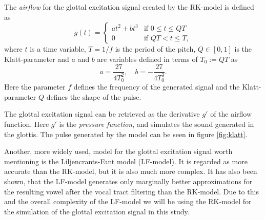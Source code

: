 \documentclass[12pt,a4]{article}
\begin{document}
The \emph{airflow} for the glottal excitation signal created by the RK-model is defined as
\begin{equation}
\label{eq:RK-model}
g(t) =
  \begin{cases}
   at^2 + bt^3  & \text{if } 0 \leq t \leq Q T \\
   0            & \text{if } Q T < t \leq T,
  \end{cases}
\end{equation}
where $t$ is a time variable, $T = 1/f$ is the period of the pitch, $Q \in \left[ 0,1 \right]$ is the Klatt-parameter and $a$ and $b$ are variables defined in terms of $T_0 := QT$ as
\begin{equation*}
a = \frac{27}{4 T_0^2}, \quad b = -\frac{27}{4 T_0^3} .
\end{equation*}
Here the parameter $f$ defines the frequency of the generated signal and the Klatt-parameter $Q$ defines the shape of the pulse.

The glottal excitation signal can be retrieved as the derivative $g'$ of the airflow function. Here $g'$ is the \emph{pressure function}, and simulates the sound generated in the glottis. The pulse generated by the model can be seen in figure \ref{fig:klatt}.

Another, more widely used, model for the glottal excitation signal worth mentioning is the Liljencrants-Fant model (LF-model).\cite{fant} It is regarded as more accurate than the RK-model, but it is also much more complex. It has also been shown, that the LF-model generates only marginally better approximations for the resulting vowel after the vocal tract filtering than the RK-model.\cite{fujisaki} Due to this and the overall complexity of the LF-model we will be using the RK-model for the simulation of the glottal excitation signal in this study.
\end{document}
